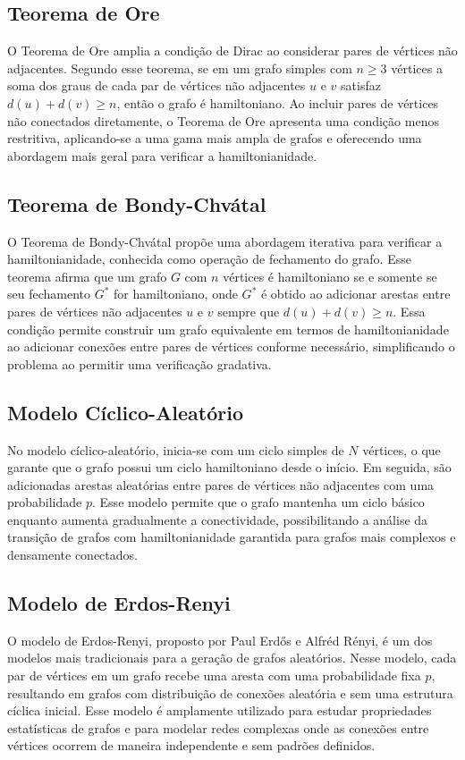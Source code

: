 \documentclass[12pt, openright, oneside, a4paper, chapter=TITLE, section=TITLE, subsection=TITLE, subsubsection=TITLE, brazil]{abntex2}
\begin{document}
\subsection{Teorema de Ore}
O Teorema de Ore amplia a condição de Dirac ao considerar pares de vértices não adjacentes. Segundo esse teorema, se em um grafo simples com $n \geq 3$ vértices a soma dos graus de cada par de vértices não adjacentes $u$ e $v$ satisfaz $d(u) + d(v) \geq n$, então o grafo é hamiltoniano. Ao incluir pares de vértices não conectados diretamente, o Teorema de Ore apresenta uma condição menos restritiva, aplicando-se a uma gama mais ampla de grafos e oferecendo uma abordagem mais geral para verificar a hamiltonianidade.

\subsection{Teorema de Bondy-Chvátal}
O Teorema de Bondy-Chvátal propõe uma abordagem iterativa para verificar a hamiltonianidade, conhecida como operação de fechamento do grafo. Esse teorema afirma que um grafo $G$ com $n$ vértices é hamiltoniano se e somente se seu fechamento $G^{*}$ for hamiltoniano, onde $G^{*}$ é obtido ao adicionar arestas entre pares de vértices não adjacentes $u$ e $v$ sempre que $d(u) + d(v) \geq n$. Essa condição permite construir um grafo equivalente em termos de hamiltonianidade ao adicionar conexões entre pares de vértices conforme necessário, simplificando o problema ao permitir uma verificação gradativa.

\subsection{Modelo Cíclico-Aleatório}
No modelo cíclico-aleatório, inicia-se com um ciclo simples de $N$ vértices, o que garante que o grafo possui um ciclo hamiltoniano desde o início. Em seguida, são adicionadas arestas aleatórias entre pares de vértices não adjacentes com uma probabilidade $p$. Esse modelo permite que o grafo mantenha um ciclo básico enquanto aumenta gradualmente a conectividade, possibilitando a análise da transição de grafos com hamiltonianidade garantida para grafos mais complexos e densamente conectados.

\subsection{Modelo de Erdos-Renyi}
O modelo de Erdos-Renyi, proposto por Paul Erdős e Alfréd Rényi, é um dos modelos mais tradicionais para a geração de grafos aleatórios. Nesse modelo, cada par de vértices em um grafo recebe uma aresta com uma probabilidade fixa $p$, resultando em grafos com distribuição de conexões aleatória e sem uma estrutura cíclica inicial. Esse modelo é amplamente utilizado para estudar propriedades estatísticas de grafos e para modelar redes complexas onde as conexões entre vértices ocorrem de maneira independente e sem padrões definidos.
\end{document}
